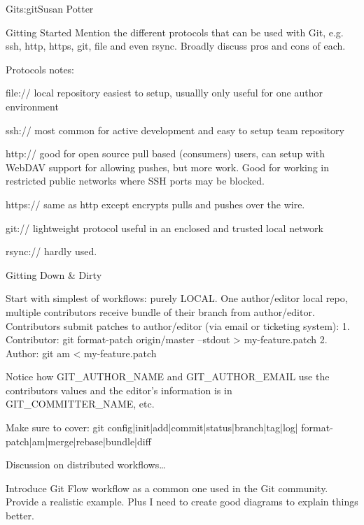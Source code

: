 \begin{aosachapter}{Git}{s:git}{Susan Potter}
\begin{aosasect1}{Gitting Started}
Mention the different protocols that can be used with Git, e.g. ssh, http, 
https, git, file and even rsync. Broadly discuss pros and cons of each.

Protocols notes: 
\begin{aosaitemize}
  \item file:// local repository easiest to setup, usuallly only useful for
    one author environment
  \item ssh:// most common for active development and easy to setup team repository
  \item http:// good for open source pull based (consumers) users, can setup with 
    WebDAV support for allowing pushes, but more work. Good for working in
    restricted public networks where SSH ports may be blocked.
  \item https:// same as http except encrypts pulls and pushes over the wire.
  \item git:// lightweight protocol useful in an enclosed and trusted local network
  \item rsync:// hardly used.
\end{aosaitemize}

\end{aosasect1}

\begin{aosasect1}{Gitting Down \& Dirty}

Start with simplest of workflows: purely LOCAL. One author/editor local repo,
multiple contributors receive bundle of their branch from author/editor.
Contributors submit patches to author/editor (via email or ticketing system):
1. Contributor: git format-patch origin/master --stdout > my-feature.patch
2. Author: git am < my-feature.patch

Notice how GIT\_AUTHOR\_NAME and GIT\_AUTHOR\_EMAIL use the contributors
values and the editor's information is in GIT\_COMMITTER\_NAME, etc.

Make sure to cover: git config|init|add|commit|status|branch|tag|log|
format-patch|am|merge|rebase|bundle|diff


Discussion on distributed workflows\ldots

Introduce Git Flow workflow as a common one used in the Git community. Provide
a realistic example. Plus I need to create good diagrams to explain things
better.


\end{aosasect1}
\end{aosachapter}
